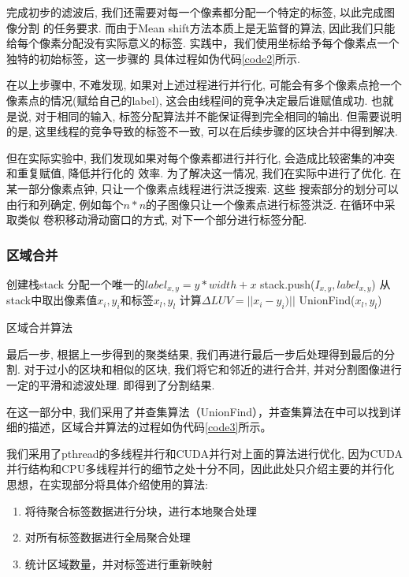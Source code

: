 \documentclass[a4paper, 11pt]{article}
\begin{document}
完成初步的滤波后, 我们还需要对每一个像素都分配一个特定的标签, 以此完成图像分割
的任务要求. 而由于Mean shift方法本质上是无监督的算法, 因此我们只能给每个像素分配没有实际意义的标签. 实践中，我们使用坐标给予每个像素点一个独特的初始标签，这一步骤的
具体过程如伪代码\ref{code2}所示.

在以上步骤中, 不难发现, 如果对上述过程进行并行化, 可能会有多个像素点抢一个像素点的情况(赋给自己的label), 
这会由线程间的竞争决定最后谁赋值成功. 也就是说, 对于相同的输入, 标签分配算法并不能保证得到完全相同的输出.
但需要说明的是, 这里线程的竞争导致的标签不一致, 可以在后续步骤的区块合并中得到解决.

但在实际实验中, 我们发现如果对每个像素都进行并行化, 会造成比较密集的冲突和重复赋值, 降低并行化的
效率. 为了解决这一情况, 我们在实际中进行了优化. 在某一部分像素点钟, 只让一个像素点线程进行洪泛搜索. 这些
搜索部分的划分可以由行和列确定, 例如每个$n*n$的子图像只让一个像素点进行标签洪泛. 在循环中采取类似
卷积移动滑动窗口的方式, 对下一个部分进行标签分配.


\subsubsection{区域合并} 

\begin{algorithm}[H]
    \DontPrintSemicolon
    创建栈stack\;
    {
        分配一个唯一的$label_{x,y}=y*width+x$\;
        stack.push($I_{x,y}, label_{x,y}$)\;
    }
    {
        从stack中取出像素值$x_i, y_i$和标签$x_l, y_l$\;
        计算$\Delta LUV=||x_i-y_i)||$\;
        {
            UnionFind($x_l, y_l$)\;
        }
    }
\caption{区域合并算法}
\label{code3}
\end{algorithm}

最后一步, 根据上一步得到的聚类结果, 我们再进行最后一步后处理得到最后的分割. 
对于过小的区块和相似的区块, 我们将它和邻近的进行合并, 并对分割图像进行一定的平滑和滤波处理. 即得到了分割结果.

在这一部分中, 我们采用了并查集算法（UnionFind），并查集算法在\autocite{Galler:1964:IEA:364099.364331}中可以找到详细的描述，区域合并算法的过程如伪代码\ref{code3}所示。

我们采用了pthread的多线程并行和CUDA并行对上面的算法进行优化, 因为CUDA并行结构和CPU多线程并行的细节之处十分不同，因此此处只介绍主要的并行化思想，在实现部分将具体介绍使用的算法:
\begin{enumerate}
    \item 将待聚合标签数据进行分块，进行本地聚合处理
    \item 对所有标签数据进行全局聚合处理
    \item 统计区域数量，并对标签进行重新映射
\end{enumerate}
\end{document}
